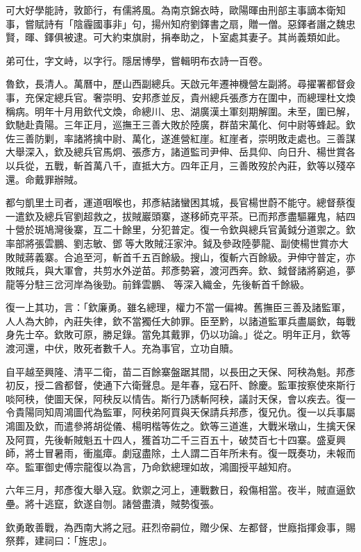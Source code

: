\begin{pinyinscope}
可大好學能詩，敦節行，有儒將風。為南京錦衣時，歐陽暉由刑部主事謫本衛知事，嘗賦詩有「陰霾國事非」句，揚州知府劉鐸書之扇，贈一僧。惡鐸者譖之魏忠賢，暉、鐸俱被逮。可大約束旗尉，捐奉助之，卜室處其妻子。其尚義類如此。

弟可仕，字文峙，以字行。隱居博學，嘗輯明布衣詩一百卷。

魯欽，長清人。萬曆中，歷山西副總兵。天啟元年遷神機營左副將。尋擢署都督僉事，充保定總兵官。奢崇明、安邦彥並反，貴州總兵張彥方在圍中，而總理杜文煥稱病。明年十月用欽代文煥，命總川、忠、湖廣漢土軍刻期解圍。未至，圍已解，欽馳赴貴陽。三年正月，巡撫王三善大敗於陸廣，群苗宋萬化、何中尉等蜂起。欽佐三善防剿，率諸將擒中尉、萬化，遂進營紅崖。紅崖者，崇明敗走處也。三善謀大舉深入，欽及總兵官馬炯、張彥方，諸道監司尹伸、岳具仰、向日升、楊世賞各以兵從，五戰，斬首萬八千，直抵大方。四年正月，三善敗歿於內莊，欽等以殘卒還。命戴罪辦賊。

都勻凱里土司者，運道咽喉也，邦彥結諸蠻困其城，長官楊世蔚不能守。總督蔡復一遣欽及總兵官劉超救之，拔賊巖頭寨，遂移師克平茶。已而邦彥盡驅羅鬼，結四十營於斑鳩灣後寨，互二十餘里，分犯普定。復一令欽與總兵官黃鉞分道禦之。欽率部將張雲鵬、劉志敏、鄧等大敗賊汪家沖。鉞及參政陸夢龍、副使楊世賞亦大敗賊蔣義寨。合追至河，斬首千五百餘級。搜山，復斬六百餘級。尹伸守普定，亦敗賊兵，與大軍會，共剪水外逆苗。邦彥勢窘，渡河西奔。欽、鉞督諸將窮追，夢龍等分駐三岔河岸為後勁。前鋒雲鵬、等深入織金，先後斬首千餘級。

復一上其功，言：「欽廉勇。雖名總理，權力不當一偏裨。舊撫臣三善及諸監軍，人人為大帥，內莊失律，欽不當獨任大帥罪。臣至黔，以諸道監軍兵盡屬欽，每戰身先士卒。欽敗可原，勝足錄。當免其戴罪，仍以功論。」從之。明年正月，欽等渡河還，中伏，敗死者數千人。充為事官，立功自贖。

自平越至興隆、清平二衛，苗二百餘寨盤踞其間，以長田之天保、阿秧為魁。邦彥初反，授二酋都督，使通下六衛聲息。是年春，寇石阡、餘慶。監軍按察使來斯行啖阿秧，使圖天保，阿秧反以情告。斯行乃誘斬阿秧，議討天保，會以疾去。復一令貴陽同知周鴻圖代為監軍，阿秧弟阿買與天保請兵邦彥，復兄仇。復一以兵事屬鴻圖及欽，而遣參將胡從儀、楊明楷等佐之。欽等三道進，大戰米墩山，生擒天保及阿買，先後斬賊魁五十四人，獲首功二千三百五十，破焚百七十四寨。盛夏興師，將士冒暑雨，衝嵐瘴。劇寇盡除，土人謂二百年所未有。復一既奏功，未報而卒。監軍御史傅宗龍復以為言，乃命欽總理如故，鴻圖授平越知府。

六年三月，邦彥復大舉入寇。欽禦之河上，連戰數日，殺傷相當。夜半，賊直逼欽壘。將十逃竄，欽遂自刎。諸營盡潰，賊勢復張。

欽勇敢善戰，為西南大將之冠。莊烈帝嗣位，贈少保、左都督，世廕指揮僉事，賜祭葬，建祠曰：「旌忠」。


\end{pinyinscope}
